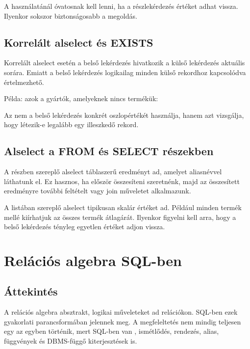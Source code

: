 A  használatánál óvatosnak kell lenni, ha a részlekérdezés  értéket adhat vissza. Ilyenkor sokszor biztonságosabb a  megoldás.

\subsection{Korrelált alselect és EXISTS}

Korrelált alselect esetén a belső lekérdezés hivatkozik a külső lekérdezés aktuális sorára. Emiatt a belső lekérdezés logikailag minden külső rekordhoz kapcsolódva értelmezhető.

Példa: azok a gyártók, amelyeknek nincs termékük:

\begin{center}
\end{center}

Az  nem a belső lekérdezés konkrét oszlopértékét használja, hanem azt vizsgálja, hogy létezik-e legalább egy illeszkedő rekord.

\subsection{Alselect a FROM és SELECT részekben}

A  részben szereplő alselect táblaszerű eredményt ad, amelyet aliasnévvel láthatunk el. Ez hasznos, ha először összesíteni szeretnénk, majd az összesített eredményre további feltételt vagy join műveletet alkalmazunk.

A  listában szereplő alselect tipikusan skalár értéket ad. Például minden termék mellé kiírhatjuk az összes termék átlagárát. Ilyenkor figyelni kell arra, hogy a belső lekérdezés tényleg egyetlen értéket adjon vissza.

\section{Relációs algebra SQL-ben}

\subsection{Áttekintés}

A relációs algebra absztrakt, logikai műveleteket ad relációkon. SQL-ben ezek gyakorlati parancsformában jelennek meg. A megfeleltetés nem mindig teljesen egy az egyben történik, mert SQL-ben van , ismétlődés, rendezés, alias, függvények és DBMS-függő kiterjesztések is.

